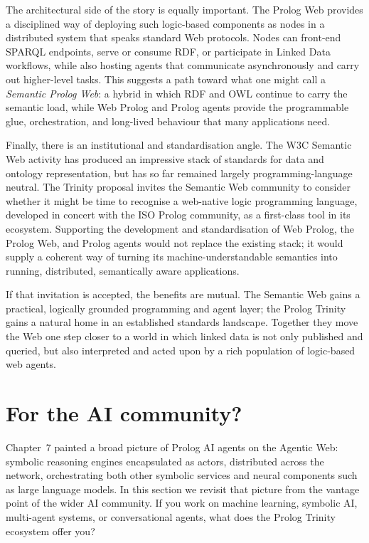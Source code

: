 The architectural side of the story is equally important. The Prolog Web provides a disciplined way of deploying such logic-based components as nodes in a distributed system that speaks standard Web protocols. Nodes can front-end SPARQL endpoints, serve or consume RDF, or participate in Linked Data workflows, while also hosting agents that communicate asynchronously and carry out higher-level tasks. This suggests a path toward what one might call a \emph{Semantic Prolog Web}: a hybrid in which RDF and OWL continue to carry the semantic load, while Web Prolog and Prolog agents provide the programmable glue, orchestration, and long-lived behaviour that many applications need.

Finally, there is an institutional and standardisation angle. The W3C Semantic Web activity has produced an impressive stack of standards for data and ontology representation, but has so far remained largely programming-language neutral. The Trinity proposal invites the Semantic Web community to consider whether it might be time to recognise a web-native logic programming language, developed in concert with the ISO Prolog community, as a first-class tool in its ecosystem. Supporting the development and standardisation of Web Prolog, the Prolog Web, and Prolog agents would not replace the existing stack; it would supply a coherent way of turning its machine-understandable semantics into running, distributed, semantically aware applications.

If that invitation is accepted, the benefits are mutual. The Semantic Web gains a practical, logically grounded programming and agent layer; the Prolog Trinity gains a natural home in an established standards landscape. Together they move the Web one step closer to a world in which linked data is not only published and queried, but also interpreted and acted upon by a rich population of logic-based web agents.

\section{For the AI community?}\label{sec:ai-community}

Chapter~7 painted a broad picture of Prolog AI agents on the Agentic Web: symbolic reasoning engines encapsulated as actors, distributed across the network, orchestrating both other symbolic services and neural components such as large language models. In this section we revisit that picture from the vantage point of the wider AI community. If you work on machine learning, symbolic AI, multi-agent systems, or conversational agents, what does the Prolog Trinity ecosystem offer you?

